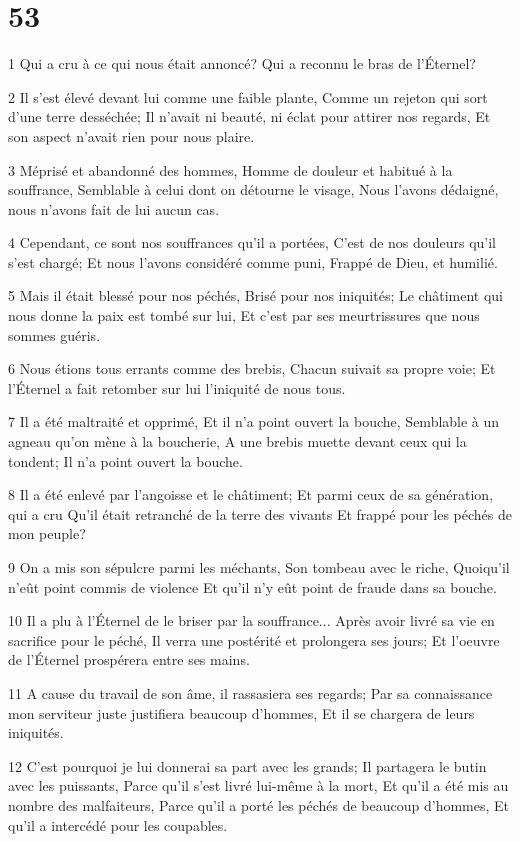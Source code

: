 \chapter{53}

\par 1 Qui a cru à ce qui nous était annoncé? Qui a reconnu le bras de l'Éternel?
\par 2 Il s'est élevé devant lui comme une faible plante, Comme un rejeton qui sort d'une terre desséchée; Il n'avait ni beauté, ni éclat pour attirer nos regards, Et son aspect n'avait rien pour nous plaire.
\par 3 Méprisé et abandonné des hommes, Homme de douleur et habitué à la souffrance, Semblable à celui dont on détourne le visage, Nous l'avons dédaigné, nous n'avons fait de lui aucun cas.
\par 4 Cependant, ce sont nos souffrances qu'il a portées, C'est de nos douleurs qu'il s'est chargé; Et nous l'avons considéré comme puni, Frappé de Dieu, et humilié.
\par 5 Mais il était blessé pour nos péchés, Brisé pour nos iniquités; Le châtiment qui nous donne la paix est tombé sur lui, Et c'est par ses meurtrissures que nous sommes guéris.
\par 6 Nous étions tous errants comme des brebis, Chacun suivait sa propre voie; Et l'Éternel a fait retomber sur lui l'iniquité de nous tous.
\par 7 Il a été maltraité et opprimé, Et il n'a point ouvert la bouche, Semblable à un agneau qu'on mène à la boucherie, A une brebis muette devant ceux qui la tondent; Il n'a point ouvert la bouche.
\par 8 Il a été enlevé par l'angoisse et le châtiment; Et parmi ceux de sa génération, qui a cru Qu'il était retranché de la terre des vivants Et frappé pour les péchés de mon peuple?
\par 9 On a mis son sépulcre parmi les méchants, Son tombeau avec le riche, Quoiqu'il n'eût point commis de violence Et qu'il n'y eût point de fraude dans sa bouche.
\par 10 Il a plu à l'Éternel de le briser par la souffrance... Après avoir livré sa vie en sacrifice pour le péché, Il verra une postérité et prolongera ses jours; Et l'oeuvre de l'Éternel prospérera entre ses mains.
\par 11 A cause du travail de son âme, il rassasiera ses regards; Par sa connaissance mon serviteur juste justifiera beaucoup d'hommes, Et il se chargera de leurs iniquités.
\par 12 C'est pourquoi je lui donnerai sa part avec les grands; Il partagera le butin avec les puissants, Parce qu'il s'est livré lui-même à la mort, Et qu'il a été mis au nombre des malfaiteurs, Parce qu'il a porté les péchés de beaucoup d'hommes, Et qu'il a intercédé pour les coupables.

